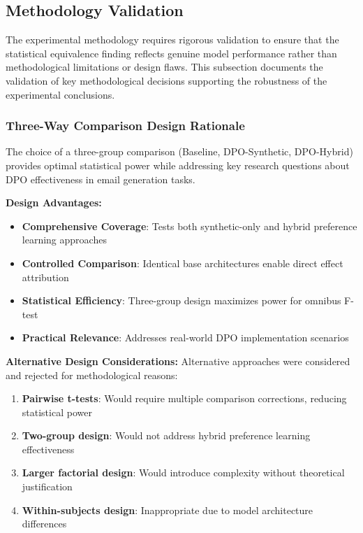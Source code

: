 \subsection{Methodology Validation}
\label{subsec:methodology-validation}

The experimental methodology requires rigorous validation to ensure that the statistical equivalence finding reflects genuine model performance rather than methodological limitations or design flaws. This subsection documents the validation of key methodological decisions supporting the robustness of the experimental conclusions.

\subsubsection{Three-Way Comparison Design Rationale}

The choice of a three-group comparison (Baseline, DPO-Synthetic, DPO-Hybrid) provides optimal statistical power while addressing key research questions about DPO effectiveness in email generation tasks.

\textbf{Design Advantages:}
\begin{itemize}
    \item \textbf{Comprehensive Coverage}: Tests both synthetic-only and hybrid preference learning approaches
    \item \textbf{Controlled Comparison}: Identical base architectures enable direct effect attribution
    \item \textbf{Statistical Efficiency}: Three-group design maximizes power for omnibus F-test
    \item \textbf{Practical Relevance}: Addresses real-world DPO implementation scenarios
\end{itemize}

\textbf{Alternative Design Considerations:}
Alternative approaches were considered and rejected for methodological reasons:
\begin{enumerate}
    \item \textbf{Pairwise t-tests}: Would require multiple comparison corrections, reducing statistical power
    \item \textbf{Two-group design}: Would not address hybrid preference learning effectiveness
    \item \textbf{Larger factorial design}: Would introduce complexity without theoretical justification
    \item \textbf{Within-subjects design}: Inappropriate due to model architecture differences
\end{enumerate}

